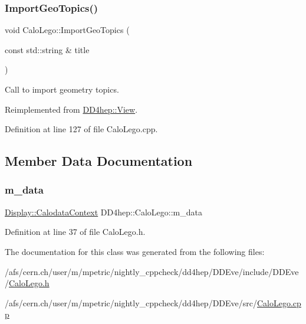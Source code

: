 \subsubsection{\texorpdfstring{Import\+Geo\+Topics()}{ImportGeoTopics()}}
{\footnotesize\ttfamily void Calo\+Lego\+::\+Import\+Geo\+Topics (\begin{DoxyParamCaption}\item[{const std\+::string \&}]{title }\end{DoxyParamCaption})\hspace{0.3cm}{\ttfamily [virtual]}}



Call to import geometry topics. 



Reimplemented from \hyperlink{class_d_d4hep_1_1_view_abd144de401f8a410789c497f44161330}{D\+D4hep\+::\+View}.



Definition at line 127 of file Calo\+Lego.\+cpp.



\subsection{Member Data Documentation}
\hypertarget{class_d_d4hep_1_1_calo_lego_a2d5755595411d469277f8e9c823eb510}{}\label{class_d_d4hep_1_1_calo_lego_a2d5755595411d469277f8e9c823eb510} 
\subsubsection{\texorpdfstring{m\+\_\+data}{m\_data}}
{\footnotesize\ttfamily \hyperlink{struct_d_d4hep_1_1_display_1_1_calodata_context}{Display\+::\+Calodata\+Context} D\+D4hep\+::\+Calo\+Lego\+::m\+\_\+data\hspace{0.3cm}{\ttfamily [private]}}



Definition at line 37 of file Calo\+Lego.\+h.



The documentation for this class was generated from the following files\+:\begin{DoxyCompactItemize}
\item 
/afs/cern.\+ch/user/m/mpetric/nightly\+\_\+cppcheck/dd4hep/\+D\+D\+Eve/include/\+D\+D\+Eve/\hyperlink{_calo_lego_8h}{Calo\+Lego.\+h}\item 
/afs/cern.\+ch/user/m/mpetric/nightly\+\_\+cppcheck/dd4hep/\+D\+D\+Eve/src/\hyperlink{_calo_lego_8cpp}{Calo\+Lego.\+cpp}\end{DoxyCompactItemize}
